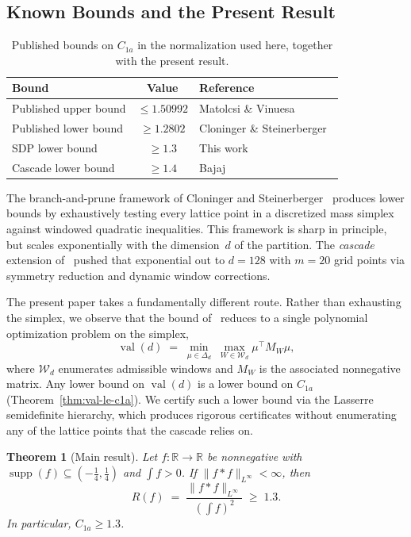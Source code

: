 \documentclass[11pt, letterpaper]{article}
\theoremstyle{paperplain}
\newtheorem{theorem}{Theorem}[section]
\theoremstyle{paperdef}
\newcommand{\R}{\mathbb{R}}
\newcommand{\supp}{\operatorname{supp}}
\newcommand{\val}{\operatorname{val}}
\begin{document}
\subsection{Known Bounds and the Present Result}

\begin{table}[t]
\centering
\begin{tabular}{lcl}
  \toprule
  \textbf{Bound} & \textbf{Value} & \textbf{Reference} \\
  \midrule
  Published upper bound & $\le 1.50992$ & Matolcsi \& Vinuesa~\cite{MV10} \\
  Published lower bound & $\ge 1.2802$  & Cloninger \& Steinerberger~\cite{CS17} \\
  SDP lower bound       & $\ge 1.3$     & This work \\
  Cascade lower bound   & $\ge 1.4$     & Bajaj~\cite{BajajCS2026} \\
  \bottomrule
\end{tabular}
\caption[Published bounds on C1a in the normalization used here.]{Published bounds on $C_{1a}$ in the normalization used here,
  together with the present result.}
\label{tab:published-bounds}
\end{table}

The branch-and-prune framework of Cloninger and
Steinerberger~\cite{CS17} produces lower bounds by exhaustively testing
every lattice point in a discretized mass simplex against windowed
quadratic inequalities.  This framework is sharp in principle, but
scales exponentially with the dimension~$d$ of the partition.  The
\emph{cascade} extension of~\cite{BajajCS2026} pushed that exponential
out to $d=128$ with $m=20$ grid points via symmetry reduction and
dynamic window corrections.

The present paper takes a fundamentally different route.  Rather than
exhausting the simplex, we observe that the bound of~\cite{CS17}
reduces to a single polynomial optimization problem on the simplex,
\[
  \val(d)
  \;=\;
  \min_{\mu \in \Delta_d}\;
  \max_{W \in \mathcal{W}_d}
  \mu^\top M_W \mu,
\]
where $\mathcal{W}_d$ enumerates admissible windows and $M_W$ is the
associated nonnegative matrix.  Any lower bound on $\val(d)$ is a lower
bound on $C_{1a}$ (Theorem~\ref{thm:val-le-c1a}).  We certify such a
lower bound via the Lasserre semidefinite hierarchy, which produces
rigorous certificates without enumerating any of the lattice points
that the cascade relies on.

\begin{theorem}[Main result]
\label{thm:main}
Let $f : \R \to \R$ be nonnegative with
$\supp(f) \subseteq (-\tfrac14,\tfrac14)$ and $\int f > 0$.  If
$\|f*f\|_{L^\infty} < \infty$, then
\[
  R(f)
  \;=\;
  \frac{\|f*f\|_{L^\infty}}{\left(\int f\right)^2}
  \;\ge\;
  1.3.
\]
In particular, $C_{1a} \ge 1.3$.
\end{theorem}
\end{document}
